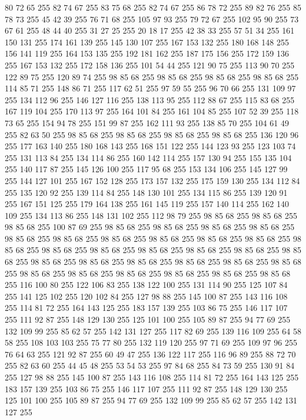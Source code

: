 80 72 65 255 82 74 67 255 83 75 68 255 82 74 67 255 86 78 72 255 89 82 76 255 85 78 73 255 45 42 39 255 76 71 68 255 105 97 93 255 79 72 67 255 102 95 90 255 73 67 61 255 48 44 40 255 31 27 25 255 20 18 17 255 42 38 33 255 57 51 34 255 161 150 131 255 174 161 139 255 145 130 107 255 167 153 132 255 180 168 148 255 156 141 119 255 164 153 135 255 192 181 162 255 187 175 156 255 172 159 136 255 167 153 132 255 172 158 136 255 101 54 44 255 121 90 75 255 113 90 70 255 122 89 75 255 120 89 74 255 98 85 68 255 98 85 68 255 98 85 68 255 98 85 68 255 114 85 71 255 148 86 71 255 117 62 51 255 97 59 55 255 96 70 66 255 131 109 97 255 134 112 96 255 146 127 116 255 138 113 95 255 112 88 67 255 115 83 68 255 167 119 104 255 170 113 97 255 164 101 84 255 161 104 85 255 107 52 39 255 118 73 65 255 154 94 78 255 151 99 87 255 162 111 93 255 138 85 70 255 104 61 49 255 82 63 50 255 98 85 68 255 98 85 68 255
98 85 68 255 98 85 68 255 136 120 96 255 177 163 140 255 180 168 143 255 168 151 122 255 144 123 93 255 123 103 74 255 131 113 84 255 134 114 86 255 160 142 114 255 157 130 94 255 155 135 104 255 140 117 87 255 145 126 100 255 117 95 68 255 153 134 106 255 145 127 99 255 144 127 101 255 167 152 128 255 173 157 132 255 175 159 130 255 134 112 84 255 135 120 92 255 139 114 84 255 148 130 101 255 134 115 86 255 139 120 91 255 167 151 125 255 179 164 138 255 161 145 119 255 157 140 114 255 162 140 109 255 134 113 86 255 148 131 102 255 112 98 79 255 98 85 68 255 98 85 68 255 98 85 68 255 100 87 69 255 98 85 68 255 98 85 68 255 98 85 68 255 98 85 68 255 98 85 68 255 98 85 68 255 98 85 68 255 98 85 68 255 98 85 68 255 98 85 68 255 98 85 68 255 98 85 68 255 98 85 68 255 98 85 68 255 98 85 68 255 98 85 68 255 98 85 68 255 98 85 68 255 98 85 68 255 98 85 68 255 98 85 68 255 98 85 68 255 98 85 68 255 98 85 68 255
98 85 68 255 98 85 68 255 98 85 68 255 98 85 68 255 98 85 68 255 116 100 80 255 122 106 83 255 138 122 100 255 131 114 90 255 125 107 84 255 141 125 102 255 120 102 84 255 127 98 88 255 145 100 87 255 143 116 108 255 114 81 72 255 164 143 125 255 183 157 139 255 103 86 75 255 146 117 107 255 111 92 87 255 148 129 130 255 125 101 100 255 105 89 87 255 94 77 69 255 132 109 99 255 85 62 57 255 142 131 127 255 117 82 69 255 139 116 109 255 64 58 58 255 108 103 103 255 75 77 80 255 132 119 120 255 97 71 69 255 109 97 96 255 76 64 63 255 121 92 87 255 60 49 47 255 136 122 117 255 116 96 89 255 88 72 70 255 82 63 60 255 44 45 48 255 53 54 53 255 97 84 68 255 84 73 59 255 130 91 84 255 127 98 88 255 145 100 87 255 143 116 108 255 114 81 72 255 164 143 125 255 183 157 139 255 103 86 75 255 146 117 107 255 111 92 87 255 148 129 130 255 125 101 100 255 105 89 87 255 94 77 69 255 132 109 99 255 85 62 57 255 142 131 127 255
